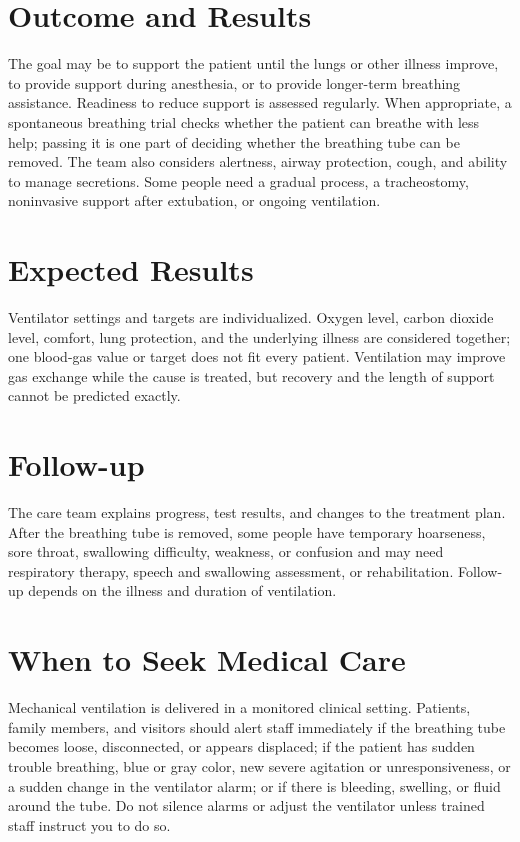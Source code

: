 \section*{Outcome and Results}
The goal may be to support the patient until the lungs or other illness improve, to provide support during anesthesia, or to provide longer-term breathing assistance. Readiness to reduce support is assessed regularly. When appropriate, a spontaneous breathing trial checks whether the patient can breathe with less help; passing it is one part of deciding whether the breathing tube can be removed. The team also considers alertness, airway protection, cough, and ability to manage secretions. Some people need a gradual process, a tracheostomy, noninvasive support after extubation, or ongoing ventilation.

\section*{Expected Results}
Ventilator settings and targets are individualized. Oxygen level, carbon dioxide level, comfort, lung protection, and the underlying illness are considered together; one blood-gas value or target does not fit every patient. Ventilation may improve gas exchange while the cause is treated, but recovery and the length of support cannot be predicted exactly.

\section*{Follow-up}
The care team explains progress, test results, and changes to the treatment plan. After the breathing tube is removed, some people have temporary hoarseness, sore throat, swallowing difficulty, weakness, or confusion and may need respiratory therapy, speech and swallowing assessment, or rehabilitation. Follow-up depends on the illness and duration of ventilation.

\section*{When to Seek Medical Care}
Mechanical ventilation is delivered in a monitored clinical setting. Patients, family members, and visitors should alert staff immediately if the breathing tube becomes loose, disconnected, or appears displaced; if the patient has sudden trouble breathing, blue or gray color, new severe agitation or unresponsiveness, or a sudden change in the ventilator alarm; or if there is bleeding, swelling, or fluid around the tube. Do not silence alarms or adjust the ventilator unless trained staff instruct you to do so.

